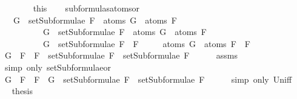 \begin{isabellebody}
\ \ \ \ \ \ \isamarkupfalse%
\ this\isanewline
\ \ \isamarkupfalse%
\isanewline
{}\isamarkupfalse%
%
\endisatagproof
{\isafoldproof}%
%
\isadelimproof
\isanewline
%
\endisadelimproof
\isanewline
{}\isamarkupfalse%
\ subformulas{\isacharunderscore}atoms{\isacharunderscore}or{\isacharcolon}\isanewline
\ \ \ {\isachardoublequoteopen}G\ {\isasymin}\ setSubformulae\ F{}\ {\isasymLongrightarrow}\ atoms\ G\ {\isasymsubseteq}\ atoms\ F{}{\isachardoublequoteclose}\isanewline
\ \ \ \ \ \ \ \ \ \ {\isachardoublequoteopen}G\ {\isasymin}\ setSubformulae\ F{}\ {\isasymLongrightarrow}\ atoms\ G\ {\isasymsubseteq}\ atoms\ F{}{\isachardoublequoteclose}\isanewline
\ \ \ \ \ \ \ \ \ \ {\isachardoublequoteopen}G\ {\isasymin}\ setSubformulae\ {\isacharparenleft}F{}\ \isactrlbold {\isasymor}\ F{}{\isacharparenright}{\isachardoublequoteclose}\isanewline
\ \ \ \ \ {\isachardoublequoteopen}atoms\ G\ {\isasymsubseteq}\ atoms\ {\isacharparenleft}F{}\ \isactrlbold {\isasymor}\ F{}{\isacharparenright}{\isachardoublequoteclose}\isanewline
%
\isadelimproof
%
\endisadelimproof
%
\isatagproof
{}\isamarkupfalse%
\ {\isacharminus}\isanewline
\ \ \isamarkupfalse%
\ {\isachardoublequoteopen}G\ {\isasymin}\ {\isacharbraceleft}F{}\ \isactrlbold {\isasymor}\ F{}{\isacharbraceright}\ {\isasymunion}\ {\isacharparenleft}setSubformulae\ F{}\ {\isasymunion}\ setSubformulae\ F{}{\isacharparenright}{\isachardoublequoteclose}\isanewline
\ \ \ \ \isamarkupfalse%
\ assms{\isacharparenleft}{}{\isacharparenright}\ \isanewline
\ \ \ \ \isamarkupfalse%
\ {\isacharparenleft}simp\ only{\isacharcolon}\ setSubformulae{\isacharunderscore}or{\isacharparenright}\isanewline
\ \ \isamarkupfalse%
\ \isamarkupfalse%
\ {\isachardoublequoteopen}G\ {\isasymin}\ {\isacharbraceleft}F{}\ \isactrlbold {\isasymor}\ F{}{\isacharbraceright}\ {\isasymor}\ G\ {\isasymin}\ setSubformulae\ F{}\ {\isasymunion}\ setSubformulae\ F{}{\isachardoublequoteclose}\isanewline
\ \ \ \ \isamarkupfalse%
\ {\isacharparenleft}simp\ only{\isacharcolon}\ Un{\isacharunderscore}iff{\isacharparenright}\isanewline
\ \ \isamarkupfalse%
\ \isamarkupfalse%
\ {\isacharquery}thesis\isanewline
\ \ \isamarkupfalse%

\end{isabellebody}
